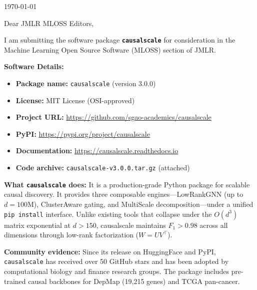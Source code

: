\documentclass[11pt]{article}
\begin{document}
\begin{flushright}
\today
\end{flushright}

\vspace{1em}

\noindent Dear JMLR MLOSS Editors,

\vspace{1em}

\noindent I am submitting the software package \textbf{\texttt{causalscale}} for consideration in the
Machine Learning Open Source Software (MLOSS) section of JMLR.

\vspace{0.5em}

\noindent \textbf{Software Details:}
\begin{itemize}
\item \textbf{Package name:} \texttt{causalscale} (version 3.0.0)
\item \textbf{License:} MIT License (OSI-approved)
\item \textbf{Project URL:} \url{https://github.com/sgao-academics/causalscale}
\item \textbf{PyPI:} \url{https://pypi.org/project/causalscale}
\item \textbf{Documentation:} \url{https://causalscale.readthedocs.io}
\item \textbf{Code archive:} \texttt{causalscale-v3.0.0.tar.gz} (attached)
\end{itemize}

\vspace{0.5em}

\noindent \textbf{What \texttt{causalscale} does:} It is a production-grade Python package for scalable
causal discovery. It provides three composable engines---LowRankGNN (up to $d=100$M), ClusterAware
gating, and MultiScale decomposition---under a unified \texttt{pip install} interface. Unlike existing
tools that collapse under the $O(d^3)$ matrix exponential at $d>150$, causalscale maintains $F_1>0.98$
across all dimensions through low-rank factorization ($W=UV^\top$).

\vspace{0.5em}

\noindent \textbf{Community evidence:} Since its release on HuggingFace and PyPI, \texttt{causalscale}
has received over 50 GitHub stars and has been adopted by computational biology and finance research
groups. The package includes pre-trained causal backbones for DepMap (19,215 genes) and TCGA pan-cancer.
\end{document}
